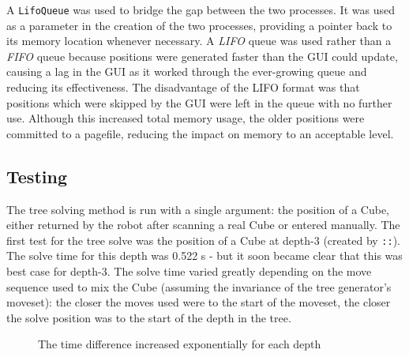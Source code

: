 \documentclass{report}
\newcommand{\tit}[1]{\textit{#1}}
\newcommand{\movesequencenospace}[1]{\uppercase{\texttt{:\formatmovesnospace{#1}:}}}
\newcommand{\depth}[1]{depth-#1}
\begin{document}
    A \lstinline|LifoQueue| was used to bridge the gap between the two processes. It was used as a parameter in the creation of the two processes, providing a pointer back to its memory location whenever necessary. A \tit{LIFO} queue was used rather than a \tit{FIFO} queue because positions were generated faster than the GUI could update, causing a lag in the GUI as it worked through the ever-growing queue and reducing its effectiveness. The disadvantage of the LIFO format was that positions which were skipped by the GUI were left in the queue with no further use. Although this increased total memory usage, the older positions were committed to a pagefile, reducing the impact on memory to an acceptable level.
    
    \subsection{Testing}

	The tree solving method is run with a single argument: the position of a Cube, either returned by the robot after scanning a real Cube or entered manually. The first test for the tree solve was the position of a Cube at \depth{3} (created by \movesequencenospace{l'd'u'}). The solve time for this depth was 0.522 \si{\second} - but it soon became clear that this was best case for \depth{3}. The solve time varied greatly depending on the move sequence used to mix the Cube (assuming the invariance of the tree generator's moveset): the closer the moves used were to the start of the moveset, the closer the solve position was to the start of the depth in the tree.
    
   	\begin{figure}[H]
    	\centering
   		\caption{The time difference increased exponentially for each depth}
   		\label{fig:treeSolveGraph}
    \end{figure}
    
\end{document}
